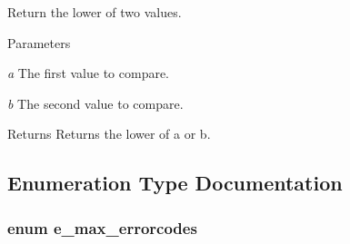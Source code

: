 Return the lower of two values. 
\begin{DoxyParams}{Parameters}
\item[{\em a}]The first value to compare. \item[{\em b}]The second value to compare. \end{DoxyParams}
\begin{DoxyReturn}{Returns}
Returns the lower of a or b. 
\end{DoxyReturn}


\subsection{Enumeration Type Documentation}
\hypertarget{group__misc_ga0764dd6c02b76cca7d053ae50555d69d}{
\subsubsection[{e\_\-max\_\-errorcodes}]{\setlength{\rightskip}{0pt plus 5cm}enum {\bf e\_\-max\_\-errorcodes}}}
\label{group__misc_ga0764dd6c02b76cca7d053ae50555d69d}


